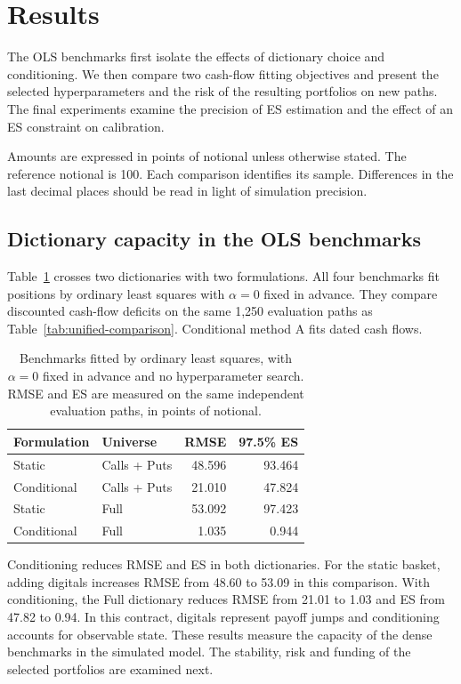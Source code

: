\section{Results}

The OLS benchmarks first isolate the effects of dictionary choice and conditioning. We then compare two cash-flow fitting objectives and present the selected hyperparameters and the risk of the resulting portfolios on new paths. The final experiments examine the precision of ES estimation and the effect of an ES constraint on calibration.

Amounts are expressed in points of notional unless otherwise stated. The reference notional is 100. Each comparison identifies its sample. Differences in the last decimal places should be read in light of simulation precision.

\subsection{Dictionary capacity in the OLS benchmarks}

Table~\ref{tab:ols-capacity} crosses two dictionaries with two formulations. All four benchmarks fit positions by ordinary least squares with $\alpha=0$ fixed in advance. They compare discounted cash-flow deficits on the same 1,250 evaluation paths as Table~\ref{tab:unified-comparison}. Conditional method A fits dated cash flows.

\begin{table}[htbp]
\centering
\small
\begin{tabular}{llrr}
\toprule
Formulation & Universe & RMSE & 97.5\% ES \\
\midrule
Static & Calls + Puts & 48.596 & 93.464 \\
Conditional & Calls + Puts & 21.010 & 47.824 \\
Static & Full & 53.092 & 97.423 \\
Conditional & Full & 1.035 & 0.944 \\
\bottomrule
\end{tabular}
\caption{Benchmarks fitted by ordinary least squares, with $\alpha=0$ fixed in advance and no hyperparameter search. RMSE and ES are measured on the same independent evaluation paths, in points of notional.}
\label{tab:ols-capacity}
\end{table}

Conditioning reduces RMSE and ES in both dictionaries. For the static basket, adding digitals increases RMSE from 48.60 to 53.09 in this comparison. With conditioning, the Full dictionary reduces RMSE from 21.01 to 1.03 and ES from 47.82 to 0.94. In this contract, digitals represent payoff jumps and conditioning accounts for observable state. These results measure the capacity of the dense benchmarks in the simulated model. The stability, risk and funding of the selected portfolios are examined next.

